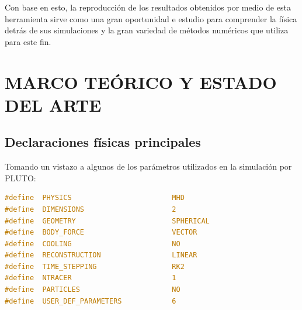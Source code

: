 \documentclass[11pt, letterpaper]{article}
\begin{document}
\medskip

Con base en esto, la reproducción de los resultados obtenidos por medio de esta herramienta sirve como una gran oportunidad e estudio para comprender la física detrás de sus simulaciones y la gran variedad de métodos numéricos que utiliza para este fin.

\section{MARCO TEÓRICO Y ESTADO DEL ARTE}

\subsection{Declaraciones físicas principales}

Tomando un vistazo a algunos de los parámetros utilizados en la simulación por PLUTO:

\begin{lstlisting}[language=C, caption={Parámetros físicos principales (definitions\_03.h)}, label={lst:definitions_Physics1}]
#define  PHYSICS                        MHD
#define  DIMENSIONS                     2
#define  GEOMETRY                       SPHERICAL
#define  BODY_FORCE                     VECTOR
#define  COOLING                        NO
#define  RECONSTRUCTION                 LINEAR
#define  TIME_STEPPING                  RK2
#define  NTRACER                        1
#define  PARTICLES                      NO
#define  USER_DEF_PARAMETERS            6
\end{lstlisting}
\end{document}
